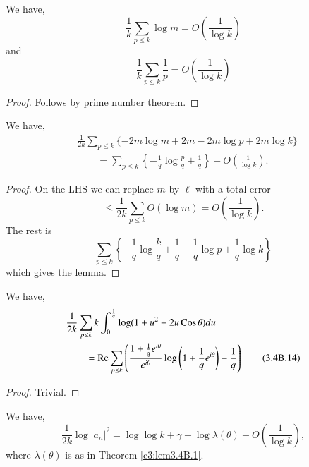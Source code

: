 \begin{alphlemma}\label{c3:lem3.4B.3}
We have,\pageoriginale
\begin{equation*}
\frac{1}{k} \sum\limits_{p\leq k} \log m = O\left(\frac{1}{\log k} \right)  \tag{3.4B.12}\label{c3:eq3.4B.12}
\end{equation*}
and
$$
\frac{1}{k} \sum\limits_{p\leq k} \frac{1}{p} = O \left(\frac{1}{\log k} \right)
$$
\end{alphlemma}

\begin{proof}
Follows by prime number theorem.
\end{proof}

\begin{alphlemma}\label{c3:lem3.4B.4}
We have,
\begin{align*}
&\frac{1}{2k} \sum\limits_{p\leq k} \{-2 m \log m + 2m - 2m \log p + 2m
\log k\}\\ 
&\qquad = \sum\limits_{p\leq k} \left\{-\frac{1}{q} \log \frac{p}{q}
+ \frac{1}{q} \right\}  + O \left(\frac{1}{\log k} \right)
. \tag{3.4B.13}\label{c3:eq3.4B.13} 
\end{align*}
\end{alphlemma}

\begin{proof}
On the LHS we can replace $m$ by $\ell$ with a total error 
$$\leq \frac{1}{2k} \sum\limits_{p\leq k} O(\log m) = O (\frac{1}{\log
  k}).
$$ 
The rest is  
$$
\sum\limits_{p \leq k} \left\{ -\frac{1}{q} \log \frac{k}{q} + \frac{1}{q} - \frac{1}{q}  \log p + \frac{1}{q} \log k  \right\}
$$
which gives the lemma.
\end{proof}

\begin{alphlemma}\label{c3:lem3.4B.5}
We have,
\begin{align*}
&\frac{1}{2k} \sum\limits_{p\leq k} k \int^{\frac{1}{q}}_0 \log (1+u^2
  + 2u \operatorname{Cos} \theta) du\\ 
&\qquad = \operatorname{Re} \sum\limits_{p\leq k} \left( \frac{1+ \frac{1}{q}
    e^{i\theta}}{e^{i\theta}} \log \left( 1+ \frac{1}{q} e^{i\theta}
  \right) -\frac{1}{q}\right) \tag{3.4B.14}\label{c3:eq3.4B.14} 
\end{align*}
\end{alphlemma}

\begin{proof}
Trivial.
\end{proof}

\begin{alphlemma}\label{c3:lem3.4B.6}
We have,
\begin{equation*}
\frac{1}{2k} \log |a_n|^2 = \log \log k + \gamma + \log \lambda(\theta) + O\left( \frac{1}{\log k}\right),  \tag{3.4B.15}\label{c3:eq3.4B.15}
\end{equation*}
where $\lambda (\theta)$ is as in Theorem \ref{c3:lem3.4B.1}.
\end{alphlemma}

